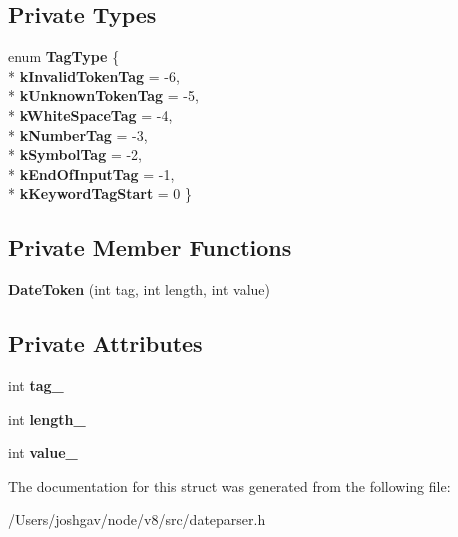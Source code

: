 \subsection*{Private Types}
\begin{DoxyCompactItemize}
\item 
enum {\bfseries Tag\+Type} \{ \\*
{\bfseries k\+Invalid\+Token\+Tag} = -\/6, 
\\*
{\bfseries k\+Unknown\+Token\+Tag} = -\/5, 
\\*
{\bfseries k\+White\+Space\+Tag} = -\/4, 
\\*
{\bfseries k\+Number\+Tag} = -\/3, 
\\*
{\bfseries k\+Symbol\+Tag} = -\/2, 
\\*
{\bfseries k\+End\+Of\+Input\+Tag} = -\/1, 
\\*
{\bfseries k\+Keyword\+Tag\+Start} = 0
 \}\hypertarget{structv8_1_1internal_1_1_date_parser_1_1_date_token_ae1611ef5ebb3124671255e341d601ba9}{}\label{structv8_1_1internal_1_1_date_parser_1_1_date_token_ae1611ef5ebb3124671255e341d601ba9}

\end{DoxyCompactItemize}
\subsection*{Private Member Functions}
\begin{DoxyCompactItemize}
\item 
{\bfseries Date\+Token} (int tag, int length, int value)\hypertarget{structv8_1_1internal_1_1_date_parser_1_1_date_token_ac3e3bc58aa9379326812e9f65554ac37}{}\label{structv8_1_1internal_1_1_date_parser_1_1_date_token_ac3e3bc58aa9379326812e9f65554ac37}

\end{DoxyCompactItemize}
\subsection*{Private Attributes}
\begin{DoxyCompactItemize}
\item 
int {\bfseries tag\+\_\+}\hypertarget{structv8_1_1internal_1_1_date_parser_1_1_date_token_a0066f0bbe4855e18e105042fd3e00a54}{}\label{structv8_1_1internal_1_1_date_parser_1_1_date_token_a0066f0bbe4855e18e105042fd3e00a54}

\item 
int {\bfseries length\+\_\+}\hypertarget{structv8_1_1internal_1_1_date_parser_1_1_date_token_af5921dd9bf480234f168c7c63ff4cb0e}{}\label{structv8_1_1internal_1_1_date_parser_1_1_date_token_af5921dd9bf480234f168c7c63ff4cb0e}

\item 
int {\bfseries value\+\_\+}\hypertarget{structv8_1_1internal_1_1_date_parser_1_1_date_token_aef6a4c2c22da16152eede9d1c2727ccf}{}\label{structv8_1_1internal_1_1_date_parser_1_1_date_token_aef6a4c2c22da16152eede9d1c2727ccf}

\end{DoxyCompactItemize}


The documentation for this struct was generated from the following file\+:\begin{DoxyCompactItemize}
\item 
/\+Users/joshgav/node/v8/src/dateparser.\+h\end{DoxyCompactItemize}
